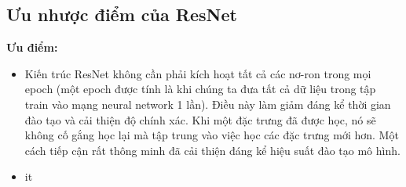 \subsection{Ưu nhược điểm của ResNet}
\textbf{Ưu điểm:}
\begin{itemize}
	\item Kiến trúc ResNet không cần phải kích hoạt tất cả các nơ-ron trong mọi epoch (một epoch được tính là khi chúng ta đưa tất cả dữ liệu trong tập train vào mạng neural network 1 lần). Điều này làm giảm đáng kể thời gian đào tạo và cải thiện độ chính xác. Khi một đặc trưng đã được học, nó sẽ không cố gắng học lại mà tập trung vào việc học các đặc trưng mới hơn. Một cách tiếp cận rất thông minh đã cải thiện đáng kể hiệu suất đào tạo mô hình.
	\item it
\end{itemize}